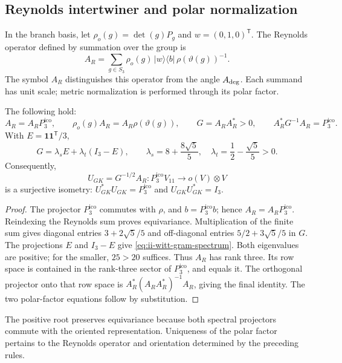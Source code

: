\subsection{Reynolds intertwiner and polar normalization}

In the branch basis, let \(\rho_o(g)=\det(g)P_g\) and
\(w=(0,1,0)^{\mathsf T}\). The Reynolds operator defined by summation
over the group is
\begin{equation}
 A_R=\sum_{g\in S_3}\rho_o(g)\,|w\rangle\langle b|\,
                       \rho(\vartheta(g))^{-1}.
 \label{eq:ii-witt-reynolds}
\end{equation}
The symbol \(A_R\) distinguishes this operator from the angle
\(A_{\rm deg}\). Each summand has unit scale; metric
normalization is performed through its polar factor.

\begin{proposition}
\label{prop:ii-witt-polar}
The following hold:
\[
 A_R=A_RP_3^{\mathrm{ico}},\qquad
 \rho_o(g)A_R=A_R\rho(\vartheta(g)),\qquad
 G=A_RA_R^*>0,\qquad A_R^*G^{-1}A_R=P_3^{\mathrm{ico}}.
\]
With \(E=\mathbf1\mathbf1^{\mathsf T}/3\),
\begin{equation}
 G=\lambda_sE+\lambda_t(I_3-E),\qquad
 \lambda_s=8+\frac{8\sqrt5}{5},\quad
 \lambda_t=\frac12-\frac{\sqrt5}{5}>0.
 \label{eq:ii-witt-gram-spectrum}
\end{equation}
Consequently,
\[
 U_{GK}=G^{-1/2}A_R:P_3^{\mathrm{ico}}V_{11}\longrightarrow o(V)\otimes V
\]
is a surjective isometry:
\(U_{GK}^*U_{GK}=P_3^{\mathrm{ico}}\) and \(U_{GK}U_{GK}^*=I_3\).
\end{proposition}
\begin{proof}
The projector \(P_3^{\mathrm{ico}}\) commutes with \(\rho\), and \(b=P_3^{\mathrm{ico}}b\);
hence \(A_R=A_RP_3^{\mathrm{ico}}\). Reindexing the Reynolds sum proves
equivariance. Multiplication of the finite sum gives diagonal entries
\(3+2\sqrt5/5\) and off-diagonal entries
\(5/2+3\sqrt5/5\) in \(G\). The projections \(E\) and \(I_3-E\)
give \eqref{eq:ii-witt-gram-spectrum}. Both eigenvalues are
positive; for the smaller, \(25>20\) suffices. Thus \(A_R\) has
rank three. Its row space is contained in the rank-three sector
of \(P_3^{\mathrm{ico}}\), and equals it. The orthogonal projector onto that row
space is \(A_R^*(A_RA_R^*)^{-1}A_R\), giving the final identity.
The two polar-factor equations follow by substitution.
\end{proof}

The positive root preserves equivariance because both spectral
projectors commute with the oriented representation. Uniqueness of the
polar factor pertains to the Reynolds operator and orientation
determined by the preceding rules.

